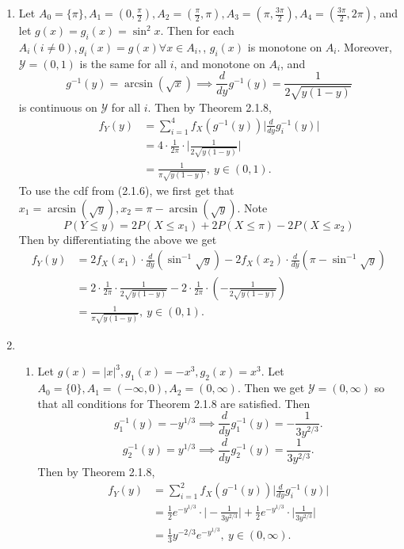 \documentclass{article}
\begin{document}
\begin{enumerate}
    \item Let $A_0 = \{\pi\}, A_1 = (0, \frac{\pi}{2}), A_2 = (\frac{\pi}{2}, \pi), A_3 = (\pi, 
    \frac{3\pi}{2}), A_4 = (\frac{3\pi}{2}, 2\pi)$, and let $g(x) = g_i(x) = \sin^2{x}$. Then for each 
    $A_i (i \neq 0), g_i(x) = g(x) \forall x \in A_i,$, $g_i(x)$ is monotone on $A_i$. 
    Moreover, $\mathcal{Y} = (0, 1)$ is the same for all $i$, and monotone on $A_i$, and 
    \[
    g^{-1}(y) = \arcsin{(\sqrt{x})} \implies \frac{d}{dy}g^{-1}(y) = \frac{1}{2\sqrt{y(1 - y)}}
    \]
    is continuous on $\mathcal{Y}$ for all $i$. Then by Theorem 2.1.8,
    \begin{align*}
        f_{Y}(y) 
        &= \sum_{i = 1}^{4} f_{X}(g^{-1}(y)) \Big| \frac{d}{dy}g_{i}^{-1}(y) \Big| \\
        &= 4 \cdot \frac{1}{2\pi} \cdot \Big| \frac{1}{2\sqrt{y(1 - y)}} \Big| \\
        &= \frac{1}{\pi\sqrt{y(1 - y)}}, \ y \in (0, 1).
    \end{align*}
    To use the cdf from (2.1.6), we first get that $x_1 = \arcsin{(\sqrt{y})}, x_2 = \pi 
    - \arcsin{(\sqrt{y})}$. Note 
    \[ P(Y \leq y) = 2P(X \leq x_1) + 2P(X \leq \pi) - 2P(X \leq x_2) \]
    Then by differentiating the above we get 
    \begin{align*}
        f_{Y}(y)
        &= 2f_{X}(x_1) \cdot \frac{d}{dy}(\sin^{-1}{\sqrt{y}}) 
        - 2f_{X}(x_2) \cdot \frac{d}{dy}(\pi - \sin^{-1}{\sqrt{y}}) \\
        &= 2 \cdot \frac{1}{2\pi} \cdot \frac{1}{2\sqrt{y(1 - y)}} 
        - 2 \cdot \frac{1}{2\pi} \cdot (-\frac{1}{2\sqrt{y(1 - y)}}) \\
        &= \frac{1}{\pi\sqrt{y(1 - y)}}, \ y \in (0, 1).
    \end{align*}

    \item \begin{enumerate}
        \item Let $g(x) = |x|^3, g_1(x) = -x^3, g_2(x) = x^3$. Let $A_0 = \{0\}, A_1 = (-\infty, 0), 
        A_2 = (0, \infty)$. Then we get $\mathcal{Y} = (0, \infty)$ so that all conditions for Theorem 2.1.8 
        are satisfied. Then 
        \[ g_{1}^{-1}(y) = -y^{1/3} \implies \frac{d}{dy}g_{1}^{-1}(y) = -\frac{1}{3y^{2/3}}. \]
        \[ g_{2}^{-1}(y) = y^{1/3} \implies \frac{d}{dy}g_{2}^{-1}(y) = \frac{1}{3y^{2/3}}. \]        
        Then by Theorem 2.1.8,
        \begin{align*}
            f_{Y}(y) 
            &= \sum_{i = 1}^{2} f_{X}(g^{-1}(y)) \Big| \frac{d}{dy}g_{i}^{-1}(y) \Big| \\
            &= \frac{1}{2}e^{-y^{1/3}} \cdot \Big| -\frac{1}{3y^{2/3}} \Big|
            + \frac{1}{2}e^{-y^{1/3}} \cdot \Big| \frac{1}{3y^{2/3}} \Big| \\
            &= \frac{1}{3}y^{-2/3}e^{-y^{1/3}}, \ y \in (0, \infty).
        \end{align*}


\end{enumerate}
\end{enumerate}
\end{document}
